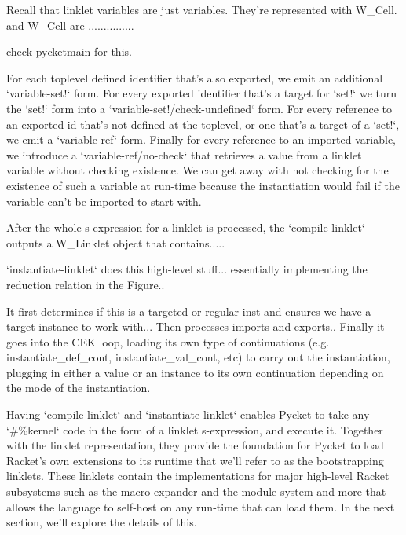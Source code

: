 		\begin{paragraph-here}%
			Recall that linklet variables are just variables. They're represented with W\_Cell. and W\_Cell are ...............

				check pycketmain for this.
		\end{paragraph-here}

		\begin{paragraph-here}%
			For each toplevel defined identifier that's also exported, we emit an additional `variable-set!` form. For every exported identifier that's a target for `set!` we turn the `set!` form into a `variable-set!/check-undefined` form. For every reference to an exported id that's not defined at the toplevel, or one that's a target of a `set!`, we emit a `variable-ref` form. Finally for every reference to an imported variable, we introduce a `variable-ref/no-check` that retrieves a value from a linklet variable without checking existence. We can get away with not checking for the existence of such a variable at run-time because the instantiation would fail if the variable can't be imported to start with.
		\end{paragraph-here}

		\begin{paragraph-here}%
			After the whole s-expression for a linklet is processed, the `compile-linklet` outputs a W\_Linklet object that contains.....
		\end{paragraph-here}

		\begin{paragraph-here}%
			`instantiate-linklet` does this high-level stuff... essentially implementing the reduction relation in the Figure..
		\end{paragraph-here}

		\begin{paragraph-here}%
			It first determines if this is a targeted or regular inst and ensures we have a target instance to work with... Then processes imports and exports.. Finally it goes into the CEK loop, loading its own type of continuations (e.g. instantiate\_def\_cont, instantiate\_val\_cont, etc) to carry out the instantiation, plugging in either a value or an instance to its own continuation depending on the mode of the instantiation.
		\end{paragraph-here}

		\begin{paragraph-here}%
			Having `compile-linklet` and `instantiate-linklet` enables Pycket to take any `\#\%kernel` code in the form of a linklet s-expression, and execute it. Together with the linklet representation, they provide the foundation for Pycket to load Racket's own extensions to its runtime that we'll refer to as the bootstrapping linklets. These linklets contain the implementations for major high-level Racket subsystems such as the macro expander and the module system and more that allows the language to self-host on any run-time that can load them. In the next section, we'll explore the details of this.
		\end{paragraph-here}


